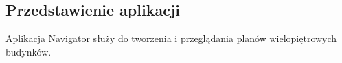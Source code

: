 \subsection{Przedstawienie aplikacji}

Aplikacja Navigator służy do tworzenia i przeglądania planów wielopiętrowych budynków.
